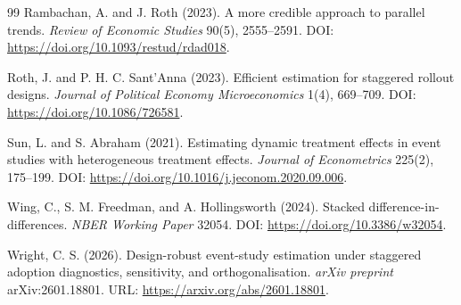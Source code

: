 \documentclass[11pt]{article}
\theoremstyle{definition}
\theoremstyle{plain}
\theoremstyle{remark}
\begin{document}
\begin{thebibliography}{99}
Rambachan, A. and J. Roth (2023).
\newblock A more credible approach to parallel trends.
\newblock \emph{Review of Economic Studies} 90(5), 2555--2591. DOI: \url{https://doi.org/10.1093/restud/rdad018}.

Roth, J. and P. H. C. Sant'Anna (2023).
\newblock Efficient estimation for staggered rollout designs.
\newblock \emph{Journal of Political Economy Microeconomics} 1(4), 669--709. DOI: \url{https://doi.org/10.1086/726581}.

Sun, L. and S. Abraham (2021).
\newblock Estimating dynamic treatment effects in event studies with heterogeneous treatment effects.
\newblock \emph{Journal of Econometrics} 225(2), 175--199. DOI: \url{https://doi.org/10.1016/j.jeconom.2020.09.006}.

Wing, C., S. M. Freedman, and A. Hollingsworth (2024).
\newblock Stacked difference-in-differences.
\newblock \emph{NBER Working Paper} 32054. DOI: \url{https://doi.org/10.3386/w32054}.

Wright, C. S. (2026).
\newblock Design-robust event-study estimation under staggered adoption diagnostics, sensitivity, and orthogonalisation.
\newblock \emph{arXiv preprint} arXiv:2601.18801. URL: \url{https://arxiv.org/abs/2601.18801}.
\end{thebibliography}
\end{document}
